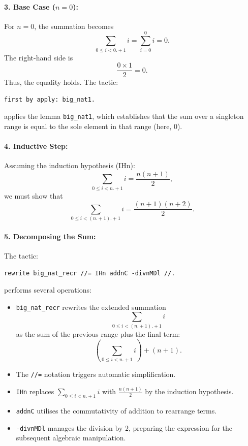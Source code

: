 \documentclass[10pt,nonacm,natbib=false]{acmart}
\begin{document}
\paragraph{3. Base Case (\( n = 0 \)):}
For \( n = 0 \), the summation becomes
\[
\sum_{0 \le i < 0.+1} i = \sum_{i=0}^{0} i = 0.
\]
The right-hand side is
\[
\frac{0 \times 1}{2} = 0.
\]
Thus, the equality holds. The tactic:
\begin{verbatim}
first by apply: big_nat1.
\end{verbatim}
applies the lemma \texttt{big\_nat1}, which establishes that the sum over a singleton range is equal to the sole element in that range (here, \(0\)).

\paragraph{4. Inductive Step:}
Assuming the induction hypothesis (IHn):
\[
\sum_{0 \le i < n.+1} i = \frac{n(n+1)}{2},
\]
we must show that
\[
\sum_{0 \le i < (n.+1).+1} i = \frac{(n+1)(n+2)}{2}.
\]

\paragraph{5. Decomposing the Sum:}
The tactic:
\begin{verbatim}
rewrite big_nat_recr //= IHn addnC -divnMDl //.
\end{verbatim}
performs several operations:
\begin{itemize}
    \item \texttt{big\_nat\_recr} rewrites the extended summation 
    \[
    \sum_{0 \le i < (n.+1).+1} i
    \]
    as the sum of the previous range plus the final term:
    \[
    \left(\sum_{0 \le i < n.+1} i\right) + (n+1).
    \]
    \item The \texttt{//=} notation triggers automatic simplification.
    \item \texttt{IHn} replaces \(\sum_{0 \le i < n.+1} i\) with \(\frac{n(n+1)}{2}\) by the induction hypothesis.
    \item \texttt{addnC} utilises the commutativity of addition to rearrange terms.
    \item \texttt{-divnMDl} manages the division by \( 2 \), preparing the expression for the subsequent algebraic manipulation.
\end{itemize}
\end{document}
